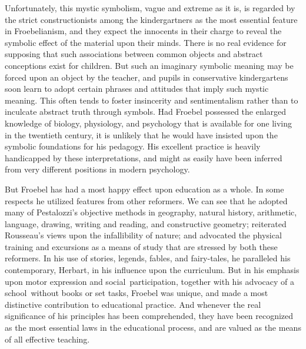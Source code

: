 \documentclass[
]{book}
\begin{document}
Unfortunately, this mystic symbolism, vague and extreme as it is, is regarded by the strict constructionists among the kindergartners as the most essential feature in Froebelianism, and they expect the innocents in their charge to reveal the symbolic effect of the material upon their minds. There is no real evidence for supposing that such associations between common objects and abstract conceptions exist for children. But such an imaginary symbolic meaning may be forced upon an object by the teacher, and pupils in conservative kindergartens soon learn to adopt certain phrases and attitudes that imply such mystic meaning. This often tends to foster insincerity and sentimentalism rather than to inculcate abstract truth through symbols. Had Froebel possessed the enlarged knowledge of biology, physiology, and psychology that is available for one living in the twentieth century, it is unlikely that he would have insisted upon the symbolic foundations for his pedagogy. His excellent practice is heavily handicapped by these interpretations, and might as easily have been inferred from very different positions in modern psychology.

But Froebel has had a most happy effect upon education as a whole. In some respects he utilized features from other reformers. We can see that he adopted many of Pestalozzi's objective methods in geography, natural history, arithmetic, language, drawing, writing and reading, and constructive geometry; reiterated Rousseau's views upon the infallibility of nature; and advocated the physical training and excursions as a means of study that are stressed by both these reformers. In his use of stories, legends, fables, and fairy-tales, he paralleled his contemporary, Herbart, in his influence upon the curriculum. But in his emphasis upon motor expression and social~participation, together with his advocacy of a school~without books or set tasks, Froebel was unique, and made a most distinctive contribution to educational practice. And whenever the real significance of his principles has been comprehended, they have been recognized as the most essential laws in the educational process, and are valued as the means of all effective teaching.
\end{document}
